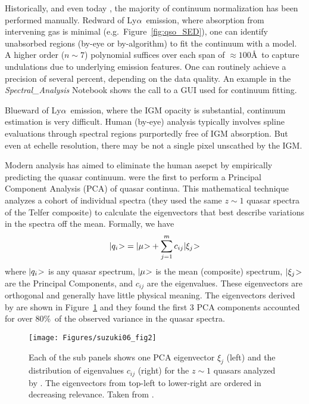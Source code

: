 \documentclass[graybox]{svmult}
\def\lya{Ly$\alpha$}
\def\ket#1{{|#1\negmedspace>}}
\def\smm{\sum\limits}
\begin{document}
Historically, and even today \cite[e.g.]{kodiaq_dr1}, the majority of 
continuum normalization has been performed manually.  Redward
of \lya\ emission, where absorption from intervening gas is
minimal (e.g.\ Figure~\ref{fig:qso_SED}), one can identify
unabsorbed regions (by-eye or by-algorithm) to fit the
continuum with a model.  A higher order ($n \sim 7$)
polynomial suffices over each span of $\approx 100$\AA\ to
capture undulations due to underlying emission features.
One can routinely achieve a precision of several percent,
depending on the data quality.  An example in the 
{\it Spectral\_Analysis} Notebook shows the call to a 
GUI used for continuum fitting.

Blueward of \lya\ emission, where the IGM opacity is
substantial, continuum estimation is very difficult.
Human (by-eye) analysis typically involves spline evaluations
through spectral regions purportedly free of IGM absorption.
But even at echelle resolution, there may be not a single
pixel unscathed by the IGM.

Modern analysis has aimed to eliminate the human asepct
by empirically predicting the quasar continuum.  
\cite{suzuki06} were the first to perform a Principal
Component Analysis (PCA) of quasar continua.  This 
mathematical technique analyzes a cohort of individual
spectra (they used the same $z \sim 1$ quasar spectra
of the Telfer composite) to calculate the eigenvectors
that best describe variations in the spectra off the mean.
Formally, we have
\begin{equation}
\ket{q_i} = \ket{\mu} + \smm_{j=1}^{m} c_{ij} \ket{\xi_j}
\label{eqn:PCA}
\end{equation}
where $\ket{q_i}$ is any quasar spectrum,
$\ket{\mu}$ is the mean (composite) spectrum,
$\ket{\xi_j}$ are the Principal Components, and
$c_{ij}$ are the eigenvalues.
These eigenvectors are orthogonal and generally
have little physical meaning.  The eigenvectors
derived by \cite{suzuki06}
are shown in Figure~\ref{fig:PCA} and they found
the first 3 PCA components accounted for over
80\%\ of the observed variance in the quasar spectra.

%
\begin{figure}[b]
\sidecaption
\texttt{[image: Figures/suzuki06\_fig2]}
%
%
\caption{Each of the sub panels shows one PCA eigenvector 
$\xi_j$  (left) 
and the distribution of eigenvalues $c_{ij}$ (right) for the 
$z\sim 1$ quasars analyzed by \cite{suzuki06}.
The eigenvectors from top-left to lower-right are ordered
in decreasing relevance.
Taken from \cite{suzuki06}.
}
\label{fig:PCA}       %
\end{figure}
\end{document}
